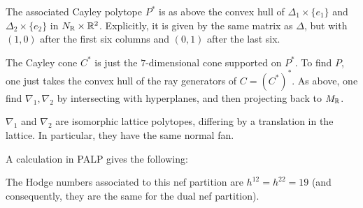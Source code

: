 \documentclass[11pt, english]{article}
\begin{document}
The associated Cayley polytope $P^\ast$ is as above the convex hull of $\Delta_1 \times \{ e_1\}$ and $\Delta_2 \times \{ e_2\} $ in $N_{\mathbb{R}} \times \mathbb{R}^2$. Explicitly, it is given by the same matrix as $\Delta$, but with $(1,0)$ after the first six columns and $(0,1)$ after the last six.

The Cayley cone $C^\ast$ is just the $7$-dimensional cone supported on $P^\ast$. To find $P$, one just takes the convex hull of the ray generators of $C=(C^\ast)^\ast$. As above, one find $\nabla_1,\nabla_2$ by intersecting with hyperplanes, and then projecting back to $M_{\mathbb{R}}$. 

\begin{lemma}
$\nabla_1$ and $\nabla_2$ are isomorphic lattice polytopes, differing by a translation in the lattice. In particular, they have the same normal fan.   
\end{lemma}

A calculation in PALP gives the following:
\begin{lemma}
The Hodge numbers associated to this nef partition are $h^{12}=h^{22}=19$ (and consequently, they are the same for the dual nef partition).
\end{lemma}
\end{document}
